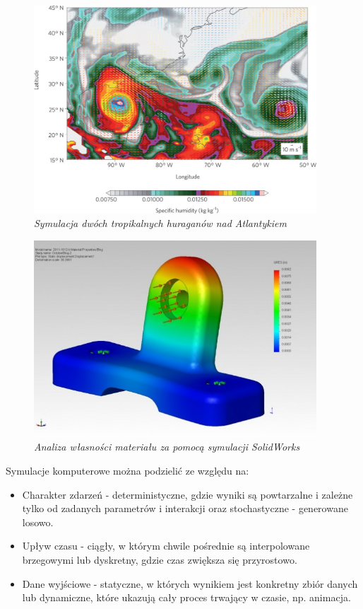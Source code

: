 \documentclass[12pt, oneside]{report}
\theoremstyle{definition}
\begin{document}
\begin{figure}[H]
	\centering
		\includegraphics[width = 300pt]{MeteorologySimulation} 
		\caption{\textit{Symulacja dwóch tropikalnych huraganów nad Atlantykiem \cite{MeteorologySimulation}}}
\label{MeteorologySimulationImage}
\end{figure}

\begin{figure}[H]
	\centering
		\includegraphics[width = 300pt]{EngineeringSimulation} 
		\caption{\textit{Analiza własności materiału za pomocą symulacji SolidWorks \cite{EngineeringSimulation}}}
\label{EngineeringSimulationImage}
\end{figure}

\newpage
Symulacje komputerowe można podzielić ze względu na:
\begin{itemize}
\item Charakter zdarzeń - deterministyczne, gdzie wyniki są powtarzalne i zależne tylko od zadanych parametrów i interakcji oraz stochastyczne - generowane losowo. 
\item Upływ czasu - ciągły, w którym chwile pośrednie są interpolowane brzegowymi lub dyskretny, gdzie czas zwiększa się przyrostowo.
\item Dane wyjściowe - statyczne, w których wynikiem jest konkretny zbiór danych lub dynamiczne, które ukazują cały proces trwający w czasie, np. animacja.
\end{itemize}
\end{document}
